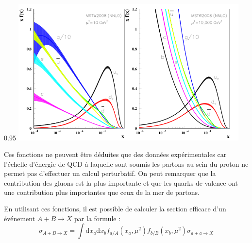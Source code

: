 \begin{minipagewithmarginpars}[h]{0.95\textwidth}
	\centering
	\includegraphics[width=0.9\textwidth]{LHC/pdf.png}
	\label{pdf}	
\end{minipagewithmarginpars}
 
Ces fonctions ne peuvent être déduites que des données expérimentales car l'échelle d'énergie de QCD à laquelle sont soumis les partons au sein du proton ne permet pas d'effectuer un calcul perturbatif. On peut remarquer que la contribution des gluons est la plus importante et que les quarks de valence ont une contribution plus importantes que ceux de la mer de partons.

En utilisant ces fonctions, il est possible de calculer la section efficace d'un événement $A+B\rightarrow X$ par la formule :
\begin{equation}
\sigma_{A+B\rightarrow X}=\int \mathrm{d}x_{a}\mathrm{d}x_{b}f_{a/A}(x_{a},\mu^{2})f_{b/B}(x_{b},\mu^{2})\sigma{_{a+a\rightarrow X}}
\end{equation}